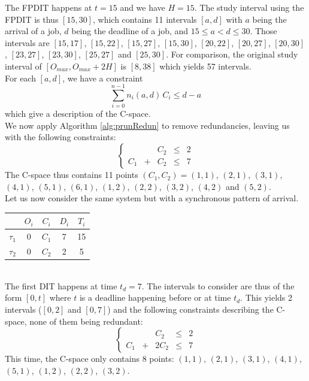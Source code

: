 \documentclass[conference]{IEEEtran}
\begin{document}
The FPDIT happens at $t=15$ and we have $H = 15$. The study interval using the FPDIT is thus $[15, 30]$, which contains 11 intervals $[a,d]$ with $a$ being the arrival of a job, $d$ being the deadline of a job, and $15 \leqslant a < d \leqslant 30$. Those intervals are
$[15, 17]$, $[15, 22]$, $[15, 27]$, $[15, 30]$, $[20, 22]$, $[20, 27]$, $[20, 30]$, $[23, 27]$, $[23, 30]$, $[25, 27]$ and $[25, 30]$. For comparison, the original study interval of $[O_{max}, O_{max} + 2H]$ is $[8, 38]$ which yields 57 intervals.\\

For each $[a, d]$, we have a constraint $$\sum_{i=0}^{n-1} n_i(a, d) \, C_i \leqslant d - a$$ which give a description of the C-space.\\

We now apply Algorithm \ref{alg:prunRedun} to remove redundancies, leaving us with the following constraints:
$$
\left\{
  \begin{array}{ccccc}
    & & C_2 & \leqslant & 2 \\
    C_1 & + & C_2 & \leqslant & 7
  \end{array}
\right.
$$
The C-space thus contains 11 points $(C_1, C_2) = (1, 1)$, $(2, 1)$, $(3, 1)$, $(4, 1)$, $(5, 1)$, $(6, 1)$, $(1, 2)$, $(2, 2)$, $(3, 2)$, $(4, 2)$ and $(5, 2)$.\\

Let us now consider the same system but with a synchronous pattern of arrival.

    \begin{center}
    \begin{tabular}{|r|c|c|c|c|}
     \hline
      & $O_i$ & $C_i$ & $D_i$ & $T_i$ \\
     \hline
     $\tau_1$ & 0 & $C_1$ & 7 & 15\\
     \hline
     $\tau_2$ & 0 & $C_2$ & 2 & 5\\
     \hline
    \end{tabular}
    \end{center}
    ~\\

The first DIT happens at time $t_d = 7$. The intervals to consider are thus of the form $[0, t]$ where $t$ is a deadline happening before or at time $t_d$. This yields 2 intervals ($[0, 2]$ and $[0, 7]$) and the following constraints describing the C-space, none of them being redundant:
$$
\left\{
  \begin{array}{ccccc}
    & & C_2 & \leqslant & 2 \\
    C_1 & + & 2 C_2 & \leqslant & 7
  \end{array}
\right.
$$
This time, the C-space only contains 8 points: $(1, 1)$, $(2, 1)$, $(3, 1)$, $(4, 1)$, $(5, 1)$, $(1, 2)$, $(2, 2)$, $(3, 2)$.\\
\end{document}
